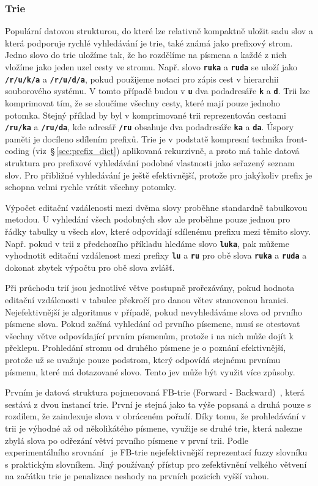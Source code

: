 \documentclass[11pt,letterpaper,oneside,openright]{book}
\newcommand{\bftt}[1]{\texttt{\textbf{#1}}}
\begin{document}
\subsubsection{Trie} \label{sec:trie}
Populární datovou strukturou, do které lze relativně kompaktně uložit sadu slov
a která podporuje rychlé vyhledávání je trie, také známá jako prefixový strom.
Jedno slovo do trie uložíme tak, že ho rozdělíme na písmena a každé z nich
vložíme jako jeden uzel cesty ve stromu. Např. slovo \bftt{ruka} a \bftt{ruda}
se uloží jako \bftt{/r/u/k/a} a \bftt{/r/u/d/a}, pokud použijeme notaci pro
zápis cest v hierarchii souborového systému. V tomto případě budou v
 \bftt{u} dva podadresáře \bftt{k} a \bftt{d}. Trii lze
komprimovat tím, že se sloučíme všechny cesty, které mají pouze jednoho
potomka. Stejný příklad by byl v komprimované trii reprezentován cestami
\bftt{/ru/ka} a \bftt{/ru/da}, kde adresář \bftt{/ru} obsahuje dva podadresáře
\bftt{ka} a \bftt{da}. Úspory paměti je docíleno sdílením prefixů. Trie je v
podstatě kompresní technika front-coding (viz~\S\,\ref{sec:prefix_dict})
aplikovaná rekurzivně, a proto má tahle datová struktura pro prefixové
vyhledávání podobné vlastnosti jako seřazený seznam slov. Pro přibližné
vyhledávání je ještě efektivnější, protože pro jakýkoliv prefix je schopna
velmi rychle vrátit všechny potomky.

Výpočet editační vzdálenosti mezi dvěma slovy proběhne standardně tabulkovou
metodou. U vyhledání všech podobných slov ale proběhne pouze jednou pro řádky
tabulky u všech slov, které odpovídají sdílenému prefixu mezi těmito slovy.
Např. pokud v trii z předchozího příkladu hledáme slovo \bftt{luka}, pak můžeme
vyhodnotit editační vzdálenost mezi prefixy \bftt{lu} a \bftt{ru} pro obě slova
\bftt{ruka} a \bftt{ruda} a dokonat zbytek výpočtu pro obě slova zvlášť.

Při průchodu trií jsou jednotlivé větve postupně prořezávány, pokud hodnota
editační vzdálenosti v tabulce překročí pro danou větev stanovenou hranici.
Nejefektivnější je algoritmus v případě, pokud nevyhledáváme slova od prvního
písmene slova. Pokud začíná vyhledání od prvního písemene, musí se otestovat
všechny větve odpovídající prvním písmenům, protože i na nich může dojít k
překlepu. Prohledání stromu od druhého písmene je o poznání efektivnější,
protože už se uvažuje pouze podstrom, který odpovídá stejnému prvnímu písmenu,
které má dotazované slovo. Tento jev může být využit více způsoby.

Prvním je datová struktura pojmenovaná FB-trie (Forward -
Backward)~\cite{Mihov:2004:FAS:1105587.1105590}, která sestává z dvou instancí
trie. První je stejná jako ta výše popsaná a druhá pouze s rozdílem, že
zaindexuje slova v obráceném pořadí. Díky tomu, že prohledávání v trii je
výhodné až od několikátého písmene, využije se druhé trie, která nalezne zbylá
slova po odřezání větví prvního písmene v první trii. Podle experimentálního
srovnání~\cite{Boytsov:2011:IMA:1963190.1963191} je FB-trie nejefektivnější
reprezentací fuzzy slovníku s praktickým slovníkem. Jiný používaný přístup pro
zefektivnění velkého větvení na začátku trie je penalizace neshody na prvních
pozicích vyšší vahou.
\end{document}
